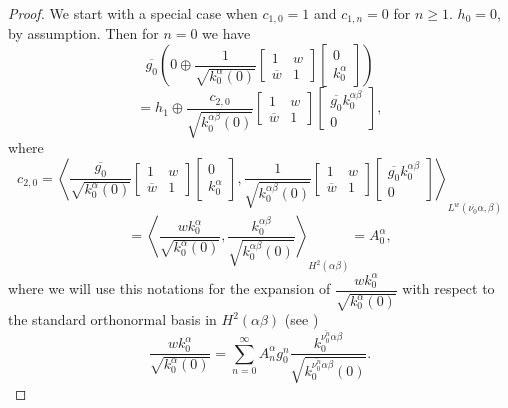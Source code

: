 \documentclass[reqno,11pt,centertags]{article}
\newcommand{\bbT}{{\mathbb{T}}}
\theoremstyle{definition}
\def\be{\begin{equation}}
\def\ee{\end{equation}}
\def\a{\alpha}
\def\b{\beta}
\def\d{\delta}
\def\D{\Delta}
\begin{document}
\begin{proof}
We start with a special case when $c_{1,0}=1$ and $c_{1,n}=0$ for
$n\ge 1$. $h_0=0$, by assumption. Then for $n=0$ we have
$$
\overline{g_0}
\left(
0
\oplus
\dfrac{1}{\sqrt{k^{\a}_0(0)}}
\begin{bmatrix}
1 & w \\
\overline{w} & 1
\end{bmatrix}
\begin{bmatrix}
0
\\
k^{\a}_0
\end{bmatrix}
\right)
$$
$$
=
h_{1}
\oplus
\dfrac{c_{2,0}}{\sqrt{k^{{\alpha\b}}_0(0)}}
\begin{bmatrix}
1 & w \\
\overline{w} & 1
\end{bmatrix}
\begin{bmatrix}
\overline{g_0} k^{{\alpha\b}}_0
\\
0
\end{bmatrix}
,
$$
where
$$
c_{2,0}=
\left\langle
\dfrac{\overline{g_0}}{\sqrt{k^\a_0(0)}}
\begin{bmatrix}
1 & w \\
\overline{w} & 1
\end{bmatrix}
\begin{bmatrix}
0
\\
k^\a_0
\end{bmatrix}
,
\dfrac{1}{\sqrt{k^{{\alpha\b}}_0(0)}}
\begin{bmatrix}
1 & w \\
\overline{w} & 1
\end{bmatrix}
\begin{bmatrix}
\overline{g_0} k^{{\alpha\b}}_0
\\
0
\end{bmatrix}
\right\rangle
_{L^w(\overline{\nu_0}\a,\b)}
$$
$$
=
\left\langle
\dfrac{wk^\a_0}{\sqrt{k^\a_0(0)}}
,
\dfrac{k^{\alpha\b}_0}{\sqrt{k^{\alpha\b}_0(0)}}
\right\rangle
_{H^2(\a\b)}
=A^\a_0,
$$
where we will use this notations for the expansion of $\dfrac{wk^\a_0}{\sqrt{k^\a_0(0)}}$ with respect to the
standard orthonormal basis in $H^2(\a\b)$ (see \cite{SY})
\be\label{260117_01}
\dfrac{wk^\a_0}{\sqrt{k^\a_0(0)}}
=
\sum\limits_{n=0}^\infty
A^\a_n
g^n_0\dfrac{k^{\overline{\nu_0^{n}}\a\b}_0}{\sqrt{k^{\overline{\nu_0^{n}}\a\b}_0(0)}}.
\ee

\end{proof}
\end{document}
